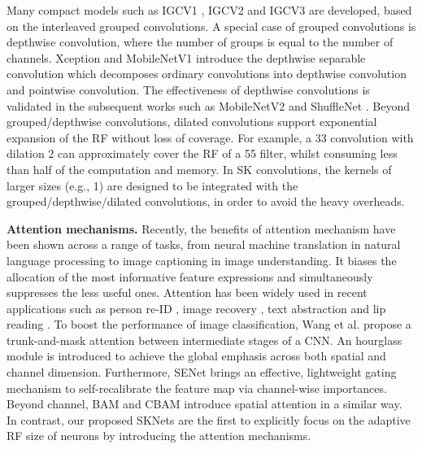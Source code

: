 \documentclass[10pt,twocolumn,letterpaper]{article}
\begin{document}
	Many compact models such as IGCV1 \cite{zhang2017interleaved}, IGCV2 \cite{xie2018igcv} and IGCV3 \cite{sun2018igcv3} are developed, based on the interleaved grouped convolutions. A special case of grouped convolutions is depthwise convolution, where the number of groups is equal to the number of channels. Xception \cite{carreira1998xception} and MobileNetV1 \cite{howard2017mobilenets} introduce the depthwise separable convolution which decomposes ordinary convolutions into depthwise convolution and pointwise convolution. The effectiveness of depthwise convolutions is  validated in the subsequent works such as MobileNetV2 \cite{sandler2018mobilenetv2} and ShuffleNet \cite{zhang1707shufflenet,ma2018shufflenet}. Beyond grouped/depthwise convolutions, dilated convolutions \cite{yu2015multi,yu2017dilated} support exponential expansion of the RF without loss of coverage. For example, a 33 convolution with dilation 2 can approximately cover the RF of a 55 filter, whilst consuming less than half of the computation and memory. In SK convolutions, the kernels of larger sizes (e.g., 1) are designed to be integrated with the grouped/depthwise/dilated convolutions, in order to avoid the heavy overheads. 
	
	\noindent \textbf{Attention mechanisms.}  Recently, the benefits of attention mechanism have been shown across a range of tasks, from neural machine translation \cite{bahdanau2014neural} in natural language processing to image captioning \cite{you2016image} in image understanding. It biases the allocation of the most informative feature expressions \cite{itti2001computational,itti1998model,larochelle2010learning,mnih2014recurrent,olshausen1993neurobiological} and simultaneously suppresses the less useful ones. Attention has been widely used in recent applications such as person {re-ID} \cite{chen2018person}, image recovery \cite{zhang2018image}, text abstraction \cite{rush2015neural} and lip reading \cite{xu2018lcanet}. To boost the performance of image classification, Wang et al. \cite{wang2017residual} propose a trunk-and-mask attention between intermediate stages of a CNN. An hourglass module is introduced to achieve the global emphasis across both spatial and channel dimension. Furthermore, SENet \cite{hu2017squeeze} brings an effective, lightweight gating mechanism to self-recalibrate the feature map via channel-wise importances. Beyond channel, BAM \cite{park2018bam} and CBAM \cite{woo2018cbam} introduce spatial attention in a similar way. In contrast, our proposed SKNets are the first to explicitly focus on the adaptive RF size of neurons by introducing the attention mechanisms.
	
\end{document}
